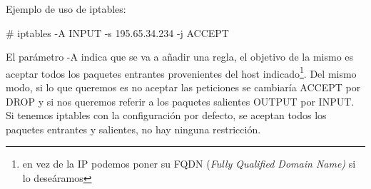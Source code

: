 Ejemplo de uso de iptables:

\begin{center}
\# iptables -A INPUT -s 195.65.34.234 -j ACCEPT\\
\end{center}


El par\'ametro -A indica que se va a a\~nadir una regla, el objetivo de la mismo es aceptar todos los paquetes entrantes provenientes del host indicado\footnote{en vez de la IP podemos poner su FQDN (\emph{Fully Qualified Domain Name)} si lo deseáramos}. Del mismo modo, si lo que queremos es no aceptar las peticiones se cambiar\'ia ACCEPT por DROP y si nos queremos referir a los paquetes salientes OUTPUT por INPUT.
Si tenemos iptables con la configuración por defecto, se aceptan todos los paquetes entrantes y salientes, no hay ninguna restricción.

